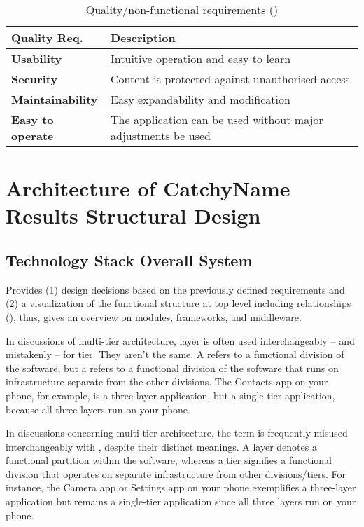 \documentclass[conference,a4paper,flushend]{cs-techrep} %
\begin{document}
\begin{table}[hbt]
\begin{tabularx}{\textwidth}{ >{\bfseries}l X }
	\toprule
	\textbf{Quality Req.} & \textbf{Description} \\
	\midrule
	Usability & Intuitive operation and easy to learn \\
	Security & Content is protected against unauthorised access \\
	Maintainability & Easy expandability and modification \\
	Easy to operate & The application can be used without major adjustments
	be used \\
	\bottomrule
\end{tabularx}
\caption{Quality/non-functional requirements ()}
\label{fig:archgoals}
\end{table}

\section{Architecture of CatchyName \textbar{} Results \textbar{} Structural Design \textbar{} }

\subsection{Technology Stack \textbar{} Overall System} %
Provides
(1) design decisions based on the previously defined requirements and
(2) a visualization of the functional structure at top level including relationships (), thus, gives an overview on modules, frameworks, and middleware.

In discussions of multi-tier architecture, layer is often used interchangeably -- and mistakenly -- for tier. They aren't the same. A  refers to a functional division of the software, but a  refers to a functional division of the software that runs on infrastructure separate from the other divisions. The Contacts app on your phone, for example, is a three-layer application, but a single-tier application, because all three layers run on your phone.

In discussions concerning multi-tier architecture, the term  is frequently misused interchangeably with , despite their distinct meanings. A layer denotes a functional partition within the software, whereas a tier signifies a functional division that operates on separate infrastructure from other divisions/tiers. For instance, the Camera app or Settings app on your phone exemplifies a three-layer application but remains a single-tier application since all three layers run on your phone.
\end{document}
